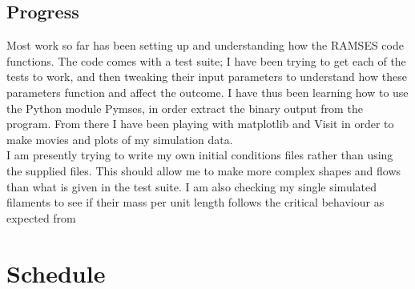 \documentclass[a4paper,12pt]{article}
\begin{document}
\subsection{Progress}

Most work so far has been setting up and understanding how the RAMSES code functions. The code comes with a test suite; I have been trying to get each of the tests to work, and then tweaking their input parameters to understand how these parameters function and affect the outcome. I have thus been learning how to use the Python module Pymses, in order extract the binary output from the program. From there I have been playing with matplotlib and Visit in order to make movies and plots of my simulation data.\\

I am presently trying to write my own initial conditions files rather than using the supplied files. This should allow me to make more complex shapes and flows than what is given in the test suite. I am also checking my single simulated filaments to see if their mass per unit length follows the critical behaviour as expected from \cite{im92}

\section{Schedule} %
\end{document}

